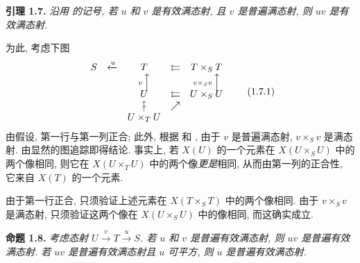 
\medskip
\noindent{}\textbf{引理 1.7.}
\textit{沿用  的记号,
若 \(u\) 和 \(v\) 是有效满态射, 且 \(v\) 是普遍满态射,
则 \(uv\) 是有效满态射.}

为此, 考虑下图
\[
\begin{array}{ccccc}
  S & \xleftarrow{u} & T & \leftleftarrows & T\times_S T \\
    &                 & \scriptstyle v\,\Big\uparrow
                      &                  & \scriptstyle v\times_Sv\,\Big\uparrow \\[-0.25em]
    &                 & U & \leftleftarrows & U\times_S U \\
    &                 & \substack{\uparrow\\[-0.6ex]\uparrow}
                      & \nearrow & \\
    &                 & U\times_T U & &
\end{array}
\tag{1.7.1}\label{sga3:iv:lemma:1:7:eq:1:7:1:01}
\]
由假设, 第一行与第一列正合; 此外, 根据
 和
, 由于 \(v\) 是普遍满态射,
\(v\times_Sv\) 是满态射. 由显然的图追踪即得结论.
事实上, 若 \(X(U)\) 的一个元素在 \(X(U\times_SU)\) 中的两个像相同,
则它在 \(X(U\times_TU)\) 中的两个像\textit{更是}相同,
从而由第一列的正合性, 它来自 \(X(T)\) 的一个元素.

由于第一行正合, 只须验证上述元素在 \(X(T\times_ST)\) 中的两个像相同.
由于 \(v\times_Sv\) 是满态射, 只须验证这两个像在
\(X(U\times_SU)\) 中的像相同, 而这确实成立.

\medskip
\noindent{}\textbf{命题 1.8.}
\textit{考虑态射 \(U\xrightarrow{v}T\xrightarrow{u}S\).
若 \(u\) 和 \(v\) 是普遍有效满态射, 则 \(uv\) 是普遍有效满态射.
若 \(uv\) 是普遍有效满态射且 \(u\) 可平方,
则 \(u\) 是普遍有效满态射.}

